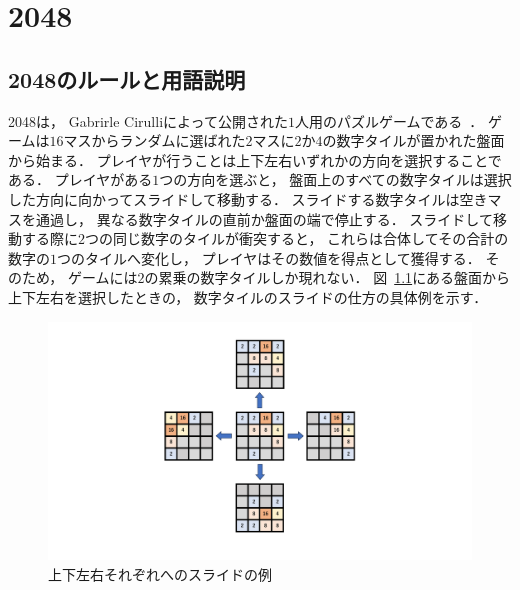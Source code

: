 \chapter{2048}

\section{2048のルールと用語説明}
\label{sec:rule}
2048は， Gabrirle Cirulliによって公開された$1$人用のパズルゲームである~\cite{2048}．
ゲームは$16$マスからランダムに選ばれた$2$マスに$2$か$4$の数字タイルが置かれた盤面から始まる．
プレイヤが行うことは上下左右いずれかの方向を選択することである． 
プレイヤがある$1$つの方向を選ぶと， 盤面上のすべての数字タイルは選択した方向に向かってスライドして移動する．
スライドする数字タイルは空きマスを通過し， 異なる数字タイルの直前か盤面の端で停止する．
スライドして移動する際に$2$つの同じ数字のタイルが衝突すると， これらは合体してその合計の数字の$1$つのタイルへ変化し， プレイヤはその数値を得点として獲得する．
そのため， ゲームには$2$の累乗の数字タイルしか現れない．
図~\ref{fig:all_directions}にある盤面から上下左右を選択したときの， 数字タイルのスライドの仕方の具体例を示す．
\begin{figure}[t]
    \centering
    \includegraphics[width=0.8\linewidth{}]{figures/all_directions.pdf}
    \caption{上下左右それぞれへのスライドの例 \label{fig:all_directions}}
\end{figure}

